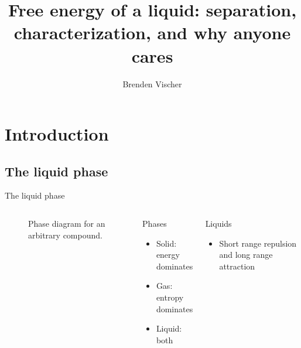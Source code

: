 \documentclass{beamer}
\title[Free energy of a liquid]{Free energy of a liquid: separation, characterization, and why anyone cares}
\author{Brenden Vischer}
\begin{document}


\begin{frame}
	\titlepage
\end{frame}


\section*{Introduction}
\subsection*{The liquid phase}
\begin{frame}{The liquid phase}
	\begin{columns}[T]
		\begin{figure}
			\caption{Phase diagram for an arbitrary compound.}
		\end{figure}
		\begin{block}{Phases}
			\begin{itemize}
				\item Solid: energy dominates
				\item Gas: entropy dominates
				\item Liquid: both
			\end{itemize}
		\end{block}
		\begin{block}{Liquids}
			\begin{itemize}
				\item Short range repulsion and long range attraction 
			\end{itemize}
		\end{block}
	\end{columns}
	
\end{frame}
\end{document}
